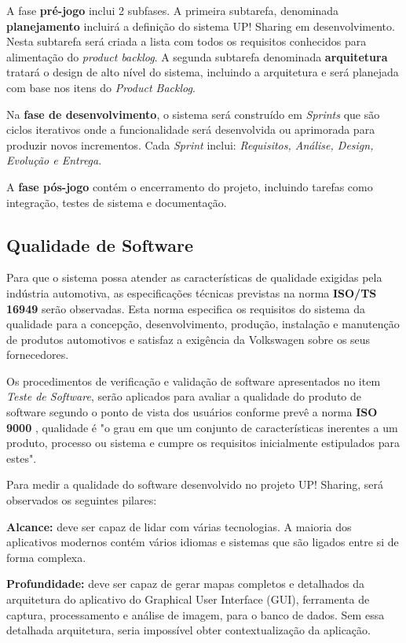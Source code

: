 \documentclass[12pt]{article}
\begin{document}
A fase \textbf{pré-jogo} inclui 2 subfases. A primeira subtarefa, denominada \textbf{planejamento} incluirá a definição do sistema UP! Sharing em desenvolvimento. Nesta subtarefa será criada a lista com todos os requisitos conhecidos para alimentação do \textit{product backlog}. A segunda subtarefa denominada \textbf{arquitetura} tratará o design de alto nível do sistema, incluindo a arquitetura e será planejada com base nos itens do \textit{Product Backlog}.
 
Na \textbf{fase de desenvolvimento}, o sistema será construído em \textit{Sprints} que são ciclos iterativos onde a funcionalidade será desenvolvida ou aprimorada para produzir novos incrementos. Cada \textit{Sprint} inclui: \textit{Requisitos, Análise, Design, Evolução e Entrega}.

A \textbf{fase pós-jogo} contém o encerramento do projeto, incluindo tarefas como integração, testes de sistema e documentação. \cite{Kumar2014}


\subsection{Qualidade de Software}

Para que o sistema possa atender as características de qualidade exigidas pela indústria automotiva, as especificações técnicas previstas na norma \textbf{ISO/TS 16949} \cite{ISOTS} serão observadas. Esta norma especifica os requisitos do sistema da qualidade para a concepção, desenvolvimento, produção, instalação e manutenção de produtos automotivos e satisfaz a exigência da Volkswagen sobre os seus fornecedores.

Os procedimentos de verificação e validação de software apresentados no item \textit{Teste de Software}, serão aplicados para avaliar a qualidade do produto de software segundo o ponto de vista dos usuários conforme prevê a norma \textbf{ISO 9000} \cite{ISO9000}, qualidade é "o grau em que um conjunto de características inerentes a um produto, processo ou sistema e cumpre os requisitos inicialmente estipulados para estes". 

Para medir a qualidade do software desenvolvido no projeto UP! Sharing, será observados os seguintes pilares:

\textbf{Alcance:} deve ser capaz de lidar com várias tecnologias. A maioria dos aplicativos modernos contém vários idiomas e sistemas que são ligados entre si de forma complexa.

\textbf{Profundidade:} deve ser capaz de gerar mapas completos e detalhados da arquitetura do aplicativo do Graphical User Interface (GUI), ferramenta de captura, processamento e análise de imagem, para o banco de dados. Sem essa detalhada arquitetura, seria impossível obter contextualização da aplicação.
\end{document}
